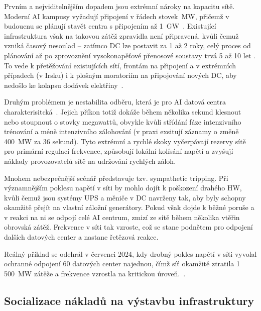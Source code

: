 Prvním a nejviditelnějším dopadem jsou extrémní nároky na kapacitu sítě. Moderní AI kampusy vyžadují připojení v řádech stovek~MW, přičemž v budoucnu se plánují stavět centra s připojením až 1~GW~\cite[s.~5]{chen_electricity_2025}. Existující infrastruktura však na takovou zátěž zpravidla není připravená, kvůli čemuž vzniká časový nesoulad -- zatímco DC lze postavit za 1 až 2 roky, celý proces od plánování až po zprovoznění vysokonapěťové přenosové soustavy trvá 5 až 10 let
\cites[s. 11]{ginzburg-ganz_technical_2025}[s. 13]{sheng_power_2026}. To vede k přetěžování existujících sítí, frontám na připojení a v extrémních případech (v Irsku) i k plošným moratoriím na připojování nových DC, aby nedošlo ke kolapsu dodávek elektřiny~\cite[s.~14]{sheng_power_2026}.

Druhým problémem je nestabilita odběru, která je pro AI datová centra charakterisitcká~\cite[s.~8--9]{sheng_power_2026}. Jejich příkon totiž dokáže během několika sekund klesnout nebo stoupnout o stovky megawattů, obvykle kvůli střídání fáze intenzivního trénování a méně intenzivního zálohování (v praxi exsitují záznamy o změně 400~MW za 36 sekund). Tyto extrémní a rychlé skoky vyčerpávají rezervy sítě pro primární regulaci frekvence, způsobují lokální kolísání napětí a zvyšují náklady provozovatelů sítě na udržování rychlých záloh.~\cite[s.~13]{ginzburg-ganz_technical_2025}

Mnohem nebezpečnější scénář představuje tzv. sympathetic tripping. Při významnějším poklesu napětí v síti by mohlo dojít k poškození drahého HW, kvůli čemuž jsou systémy UPS a měniče v DC navrženy tak, aby byly schopny okamžitě přejít na vlastní záložní generátory. Pokud však dojde k běžné poruše a v reakci na ni se odpojí celé AI centrum, zmizí ze sítě během několika vtěřin obrovská zátěž. Frekvence v síti tak vzroste, což se stane podnětem pro odpojení dalších datových center a nastane řetězová reakce.~\cite[s.~11]{sheng_power_2026}

Reálný příklad se odehrál v červenci 2024, kdy drobný pokles napětí v síti vyvolal ochranné odpojení 60 datových center najednou, čímž síť okamžitě ztratila 1 500~MW zátěže a frekvence vzrostla na kritickou úroveň.~\cite[s.~13]{ginzburg-ganz_technical_2025}.

\subsection{Socializace nákladů na výstavbu infrastruktury}
\label{subsec:energie_socializace}


